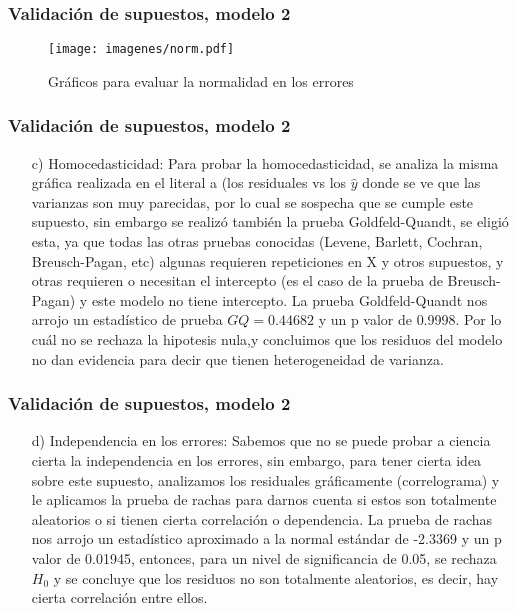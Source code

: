 \documentclass[12pt]{beamer}
\begin{document}
\begin{frame}
\frametitle{Validación de supuestos, modelo 2}
\begin{figure}[h]
  \centering
  \texttt{[image: imagenes/norm.pdf]}
  \caption{Gráficos para evaluar la normalidad en los errores}\label{figura1}
\end{figure}
\end{frame}

\begin{frame}
\frametitle{Validación de supuestos, modelo 2}
\begin{itemize}
\item[c)] Homocedasticidad: Para probar la homocedasticidad, se analiza la misma gráfica realizada en el literal a (los residuales vs los $\hat{y}$ donde se ve que las varianzas son muy parecidas, por lo cual se sospecha que se cumple este supuesto, sin embargo se realizó también la prueba Goldfeld-Quandt, se eligió esta, ya que todas las otras pruebas conocidas (Levene, Barlett, Cochran, Breusch-Pagan, etc) algunas requieren repeticiones en X y otros supuestos, y otras requieren o necesitan el intercepto (es el caso de la prueba de Breusch-Pagan) y este modelo no tiene intercepto. La prueba Goldfeld-Quandt nos arrojo un estadístico de prueba $GQ = 0.44682$ y un p valor de 0.9998. Por lo cuál no se rechaza la hipotesis nula,y concluimos que los residuos del modelo no dan evidencia para decir que tienen heterogeneidad de varianza.
\end{itemize}
\end{frame}

\begin{frame}
\frametitle{Validación de supuestos, modelo 2}
\begin{itemize}
\item[d)] Independencia en los errores: Sabemos que no se puede probar a ciencia cierta la independencia en los errores, sin embargo, para tener cierta idea sobre este supuesto, analizamos los residuales gráficamente (correlograma) y le aplicamos la prueba de rachas para darnos cuenta si estos son totalmente aleatorios o si tienen cierta correlación o dependencia. La prueba de rachas nos arrojo un estadístico aproximado a la normal estándar de -2.3369 y un p valor de 0.01945, entonces, para un nivel de significancia de 0.05, se rechaza $H_{0}$ y se concluye que los residuos no son totalmente aleatorios, es decir, hay cierta correlación entre ellos.
\end{itemize}
\end{frame}
\end{document}
